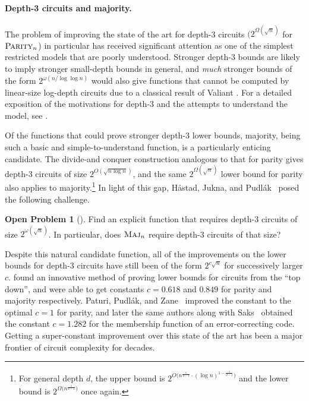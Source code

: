 \documentclass[10pt,a4paper]{article}
\theoremstyle{definition}
\newtheorem{openproblem}{Open Problem}
\theoremstyle{remark}
\newcommand{\mathsc}[1]{{\normalfont\textsc{#1}}}
\DeclareMathOperator{\Maj}{\mathsc{Maj}}
\newcommand{\Parity}{\mathsc{Parity}}
\newcommand{\Majority}{\Maj}
\begin{document}
\paragraph*{Depth-3 circuits and majority.} The problem of improving the state of the art for depth-3 circuits $(2^{\Omega(\sqrt{n})}$ for $\Parity_n$) in particular has received significant attention as one of the simplest restricted models that are poorly understood. Stronger depth-3 bounds are likely to imply stronger small-depth bounds in general, and \emph{much} stronger bounds of the form $2^{\omega(n/\log\log n)}$ would also give functions that cannot be computed by linear-size log-depth circuits due to a classical result of Valiant \cite{Val83}. %
For a detailed exposition of the  motivations for depth-3 and the attempts to understand the model, see \cite[Chapter~11]{Juk12}.

Of the functions that could prove stronger depth-3 lower bounds, majority, being such a basic and simple-to-understand function, is a particularly enticing candidate.  The divide-and conquer construction analogous to that for parity gives depth-3 circuits of size $2^{O(\sqrt{n\log n})}$, and the same $2^{\Omega(\sqrt{n})}$ lower bound for parity also applies to majority.\footnote{For general depth $d$, the upper bound is $2^{O\big(n^{\frac{1}{d-1}}\cdot (\log n)^{1-\frac{1}{d-1}}\big)}$ \cite{KPPY84} and the lower bound is $2^{\Omega\big(n^{\frac{1}{d-1}}\big)}$ once again.} In light of this gap, H{\aa}stad, Jukna, and Pudl{\'a}k~\cite{HJP93} posed the following challenge.
 
\begin{openproblem}[\cite{HJP93}]\label{op:depth3lbs}
Find an explicit function that requires depth-3 circuits of size $2^{\omega(\sqrt{n})}$.
In particular, does $\Majority_n$ require depth-3 circuits of that size?
\end{openproblem}

Despite this natural candidate function, all of the improvements on the lower bounds for \mbox{depth-3} circuits have still been of the form $2^{c\sqrt{n}}$ for successively larger $c$. \cite{HJP93} found an innovative method of proving lower bounds for circuits from the ``top down'', and were able to get constants $c = 0.618$ and $0.849$ for parity and majority respectively.
Paturi, Pudl{\'a}k, and Zane~\cite{PPZ97} improved the constant to the optimal $c=1$ for parity, and later
the same authors along with Saks~\cite{PPSZ05}
obtained the constant
$c = 1.282$ for the membership function of an error-correcting code.
Getting a super-constant improvement over this state of the art has been a major frontier of circuit complexity for decades. 
\end{document}
